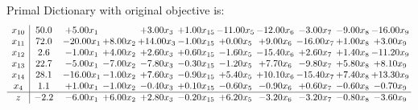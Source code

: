 \documentclass[9pt]{article}
\begin{document}
Primal Dictionary with original objective is:
\[\begin{array}{c| c c@{\hskip 2pt} c@{\hskip 2pt} c@{\hskip 2pt} c@{\hskip 2pt} c@{\hskip 2pt} c@{\hskip 2pt} c@{\hskip 2pt} c@{\hskip 2pt} c@{\hskip 2pt} }
 x_{10}   &  50.0 & +  5.00 x_{1} &   & +  3.00 x_{3} & +  1.00 x_{15} & -11.00 x_{5} & -12.00 x_{6} & -3.00 x_{7} & -9.00 x_{8} & -16.00 x_{9}\\
 x_{11}   &  72.0 & -20.00 x_{1} & +  8.00 x_{2} & + 14.00 x_{3} & -1.00 x_{15} & +  0.00 x_{5} & +  9.00 x_{6} & -16.00 x_{7} & +  1.00 x_{8} & +  3.00 x_{9}\\
 x_{12}   &  2.6 & -1.00 x_{1} & +  4.00 x_{2} & +  2.60 x_{3} & +  0.60 x_{15} & -1.60 x_{5} & -15.40 x_{6} & +  2.60 x_{7} & +  1.40 x_{8} & -11.20 x_{9}\\
 x_{13}   &  22.7 & -5.00 x_{1} & -7.00 x_{2} & -7.80 x_{3} & -0.30 x_{15} & -1.20 x_{5} & +  7.70 x_{6} & -9.80 x_{7} & +  5.80 x_{8} & +  8.10 x_{9}\\
 x_{14}   &  28.1 & -16.00 x_{1} & -1.00 x_{2} & +  7.60 x_{3} & -0.90 x_{15} & +  5.40 x_{5} & + 10.10 x_{6} & -15.40 x_{7} & +  7.40 x_{8} & + 13.30 x_{9}\\
 x_{4}   &  1.1 & +  1.00 x_{1} & -1.00 x_{2} & -0.40 x_{3} & +  0.10 x_{15} & -0.60 x_{5} & -0.90 x_{6} & +  0.60 x_{7} & -0.60 x_{8} & -0.70 x_{9}\\
\hline
z    &  -2.2 & -6.00 x_{1} & +  6.00 x_{2} & +  2.80 x_{3} & -0.20 x_{15} & +  6.20 x_{5} & -3.20 x_{6} & -3.20 x_{7} & -0.80 x_{8} & -3.60 x_{9}\\
\end{array}\]
\end{document}
